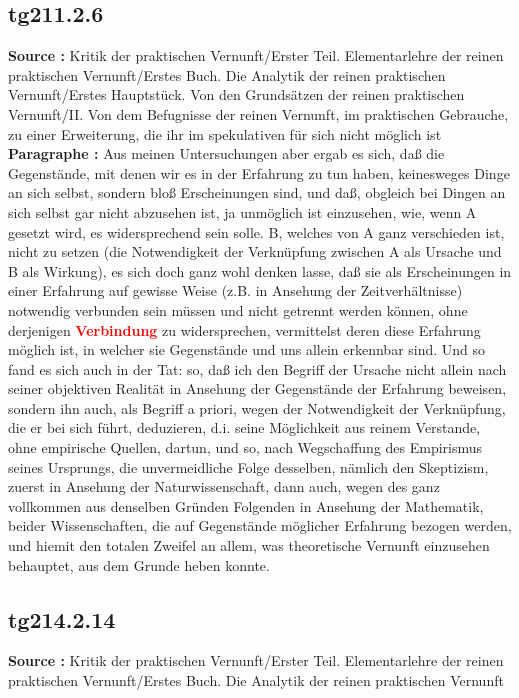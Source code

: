 \documentclass[a4paper,12pt,twoside]{book}
\newcommand{\match}[1]{\textcolor{red}{\textbf{#1}}}
\begin{document}
	\subsection*{tg211.2.6} 
	\textbf{Source : }Kritik der praktischen Vernunft/Erster Teil. Elementarlehre der reinen praktischen Vernunft/Erstes Buch. Die Analytik der reinen praktischen Vernunft/Erstes Hauptstück. Von den Grundsätzen der reinen praktischen Vernunft/II. Von dem Befugnisse der reinen Vernunft, im praktischen Gebrauche, zu einer Erweiterung, die ihr im spekulativen für sich nicht möglich ist\\  
	
	\noindent\textbf{Paragraphe : }Aus meinen Untersuchungen aber ergab es sich, daß die Gegenstände, mit denen wir es in der Erfahrung zu tun haben, keinesweges Dinge an sich selbst, sondern bloß Erscheinungen sind, und daß, obgleich bei Dingen an sich selbst gar nicht abzusehen ist, ja unmöglich ist einzusehen, wie, wenn A gesetzt wird, es widersprechend sein solle. B, welches von A ganz verschieden ist, nicht zu setzen (die Notwendigkeit der Verknüpfung zwischen A als Ursache und B als Wirkung), es sich doch ganz wohl denken lasse, daß sie als Erscheinungen in einer Erfahrung auf gewisse Weise (z.B. in Ansehung der Zeitverhältnisse) notwendig verbunden sein müssen und nicht getrennt werden können, ohne derjenigen \match{Verbindung} zu widersprechen, vermittelst deren diese Erfahrung möglich ist, in welcher sie Gegenstände und uns allein erkennbar sind. Und so fand es sich auch in der Tat: so, daß ich den Begriff der Ursache nicht allein nach seiner objektiven Realität in Ansehung der Gegenstände der Erfahrung beweisen, sondern ihn auch, als Begriff a priori, wegen der Notwendigkeit der Verknüpfung, die er bei sich führt, deduzieren, d.i. seine Möglichkeit aus reinem Verstande, ohne empirische Quellen, dartun, und so, nach Wegschaffung des Empirismus seines Ursprungs, die unvermeidliche Folge desselben, nämlich den Skeptizism, zuerst in Ansehung der Naturwissenschaft, dann auch, wegen des ganz vollkommen aus denselben Gründen Folgenden in Ansehung der Mathematik, beider Wissenschaften, die auf Gegenstände möglicher Erfahrung bezogen werden, und hiemit den totalen Zweifel an allem, was theoretische Vernunft einzusehen behauptet, aus dem Grunde heben konnte. 
	
	\subsection*{tg214.2.14} 
	\textbf{Source : }Kritik der praktischen Vernunft/Erster Teil. Elementarlehre der reinen praktischen Vernunft/Erstes Buch. Die Analytik der reinen praktischen Vernunft\\  
	
\end{document}
